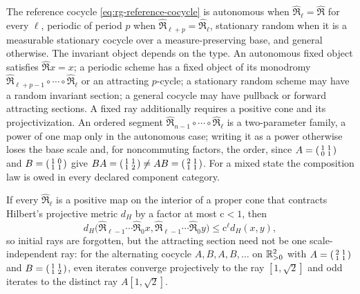 The reference cocycle \eqref{eq:rg-reference-cocycle} is autonomous when
\(\widehat{\mathfrak R}_\ell=\widehat{\mathfrak R}\) for every \(\ell\),
periodic of period \(p\) when
\(\widehat{\mathfrak R}_{\ell+p}=\widehat{\mathfrak R}_\ell\), stationary
random when it is a measurable stationary cocycle over a measure-preserving
base, and general otherwise. The invariant object depends on the type. An
autonomous fixed object satisfies \(\widehat{\mathfrak R}x=x\); a periodic
scheme has a fixed object of its monodromy
\(\widehat{\mathfrak R}_{\ell+p-1}\circ\cdots\circ\widehat{\mathfrak R}_\ell\)
or an attracting \(p\)-cycle; a stationary random scheme may have a random
invariant section; a general cocycle may have pullback or forward attracting
sections. A fixed ray additionally requires a positive cone and its
projectivization. An ordered segment
\(\widehat{\mathfrak R}_{n-1}\circ\cdots\circ\widehat{\mathfrak R}_\ell\) is a
two-parameter family, a power of one map only in the autonomous case; writing
it as a power otherwise loses the base scale and, for noncommuting factors,
the order, since
\(A=\begin{psmallmatrix}1&1\\0&1\end{psmallmatrix}\) and
\(B=\begin{psmallmatrix}1&0\\1&1\end{psmallmatrix}\) give
\(BA=\begin{psmallmatrix}1&1\\1&2\end{psmallmatrix}\neq
AB=\begin{psmallmatrix}2&1\\1&1\end{psmallmatrix}\). For a mixed state the
composition law is owed in every declared component category.

If every \(\widehat{\mathfrak R}_\ell\) is a positive map on the interior of a
proper cone that contracts Hilbert's projective metric \(d_H\) by a factor at
most \(\mathrm c<1\), then
\begin{equation}
d_H\bigl(
\widehat{\mathfrak R}_{\ell-1}\cdots\widehat{\mathfrak R}_0x,
\widehat{\mathfrak R}_{\ell-1}\cdots\widehat{\mathfrak R}_0y\bigr)
\leq\mathrm c^\ell d_H(x,y),
\label{eq:rg-cocycle-contraction}
\end{equation}
so initial rays are forgotten, but the attracting section need not be one
scale-independent ray: for the alternating cocycle \(A,B,A,B,\ldots\) on
\(\mathbb R^2_{>0}\) with
\(A=\begin{psmallmatrix}2&1\\1&1\end{psmallmatrix}\) and
\(B=\begin{psmallmatrix}1&1\\1&2\end{psmallmatrix}\), even iterates converge
projectively to the ray \([1,\sqrt2]\) and odd iterates to the distinct ray
\(A[1,\sqrt2]\). 

